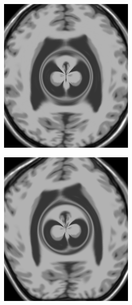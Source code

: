 \begin{figure}[h]
\begin{subfigure}[t]{0.23\textwidth}
	  \label{fig:sin-image}
	\end{subfigure}
	\begin{subfigure}[t]{0.23\textwidth}
	  \includegraphics[width=\textwidth]{figuras/movingImageDist.png}
	  \label{fig:dist-image}
	\end{subfigure}
	\begin{subfigure}[t]{0.23\textwidth}
	  \includegraphics[width=\textwidth]{figuras/movingImageSinDist.png}

\end{subfigure}
\end{figure}
